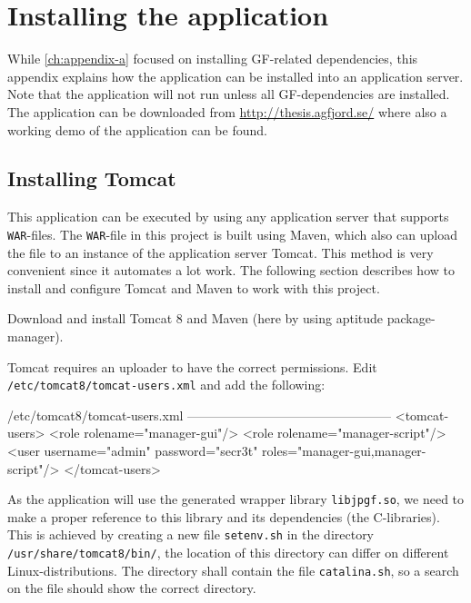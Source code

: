 \chapter{Installing the application}\label{ch:appendix-b}

While \autoref{ch:appendix-a} focused on installing GF-related dependencies, this appendix explains how the application can be installed into an application server. Note that the application will not run unless all GF-dependencies are installed. The application can be downloaded from \url{http://thesis.agfjord.se/} where also a working demo of the application can be found.

\section{Installing Tomcat}
This application can be executed by using any application server that supports \texttt{WAR}-files. The \texttt{WAR}-file in this project is built using Maven, which also can upload the file to an instance of the application server Tomcat. This method is very convenient since it automates a lot work. The following section describes how to install and configure Tomcat and Maven to work with this project.

Download and install Tomcat 8 and Maven (here by using aptitude package-manager).


Tomcat requires an uploader to have the correct permissions.
\newline
Edit \texttt{/etc/tomcat8/tomcat-users.xml} and add the following:

\begin{terminal}
/etc/tomcat8/tomcat-users.xml
------------------------------------------------
<tomcat-users>
  <role rolename="manager-gui"/>
  <role rolename="manager-script"/>
  <user username="admin" password="secr3t" roles="manager-gui,manager-script"/>
</tomcat-users>
\end{terminal}

As the application will use the generated wrapper library \texttt{libjpgf.so}, we need to make a proper reference to this library and its dependencies (the C-libraries). This is achieved by creating a new file \texttt{setenv.sh} in the directory \texttt{/usr/share/tomcat8/bin/}, the location of this directory can differ on different Linux-distributions. The directory shall contain the file \texttt{catalina.sh}, so a search on the file should show the correct directory.

